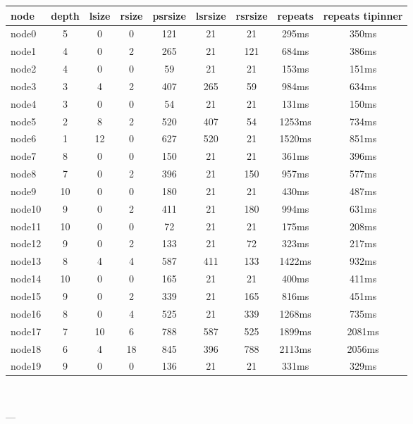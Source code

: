 

\begin{tabular}{|l|c|c|c|c|c|c|c|c|}
\hline node & depth & lsize & rsize & psrsize & lsrsize & rsrsize   & repeats & repeats tipinner\\
    \hline node0 & 5 & 0 & 0 & 121 & 21 & 21 & 295ms & 350ms\\
    \hline node1 & 4 & 0 & 2 & 265 & 21 & 121 & 684ms & 386ms\\
    \hline node2 & 4 & 0 & 0 & 59 & 21 & 21 & 153ms & 151ms\\
    \hline node3 & 3 & 4 & 2 & 407 & 265 & 59 & 984ms & 634ms\\
    \hline node4 & 3 & 0 & 0 & 54 & 21 & 21 & 131ms & 150ms\\
    \hline node5 & 2 & 8 & 2 & 520 & 407 & 54 & 1253ms & 734ms\\
    \hline node6 & 1 & 12 & 0 & 627 & 520 & 21 & 1520ms & 851ms\\
    \hline node7 & 8 & 0 & 0 & 150 & 21 & 21 & 361ms & 396ms\\
    \hline node8 & 7 & 0 & 2 & 396 & 21 & 150 & 957ms & 577ms\\
    \hline node9 & 10 & 0 & 0 & 180 & 21 & 21 & 430ms & 487ms\\
    \hline node10 & 9 & 0 & 2 & 411 & 21 & 180 & 994ms & 631ms\\
    \hline node11 & 10 & 0 & 0 & 72 & 21 & 21 & 175ms & 208ms\\
    \hline node12 & 9 & 0 & 2 & 133 & 21 & 72 & 323ms & 217ms\\
    \hline node13 & 8 & 4 & 4 & 587 & 411 & 133 & 1422ms & 932ms\\
    \hline node14 & 10 & 0 & 0 & 165 & 21 & 21 & 400ms & 411ms\\
    \hline node15 & 9 & 0 & 2 & 339 & 21 & 165 & 816ms & 451ms\\
    \hline node16 & 8 & 0 & 4 & 525 & 21 & 339 & 1268ms & 735ms\\
    \hline node17 & 7 & 10 & 6 & 788 & 587 & 525 & 1899ms & 2081ms\\
    \hline node18 & 6 & 4 & 18 & 845 & 396 & 788 & 2113ms & 2056ms\\
    \hline node19 & 9 & 0 & 0 & 136 & 21 & 21 & 331ms & 329ms\\

\hline
\end{tabular} \

---


